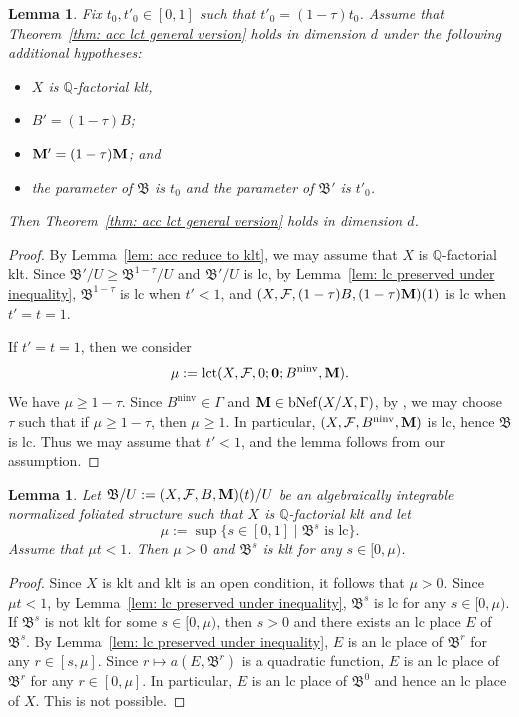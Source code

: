 \documentclass[11pt,reqno]{amsart}
\numberwithin{equation}{section}
\newcommand{\Mm}{{\bf{M}}}
\newcommand{\ninv}{\operatorname{ninv}}
\newcommand{\lct}{\operatorname{lct}}
\newcommand{\Bb}{{\mathfrak{B}}}
\newcommand{\Ff}{\mathcal{F}}
\newcommand{\Ii}{\Gamma}
\newcommand{\bNef}{\mathrm{bNef}}
\newtheorem{lem}[thm]{Lemma}
\theoremstyle{definition}
\begin{document}
\begin{lem}\label{lem: reduce to one parameter acc}
Fix $t_0, t'_0 \in [0, 1]$ such that $t'_0 = (1-\tau)t_0$.
    Assume that Theorem~\ref{thm: acc lct general version} holds in dimension $d$ under the following additional hypotheses:
    \begin{itemize}
        \item 
    $X$ is $\mathbb Q$-factorial klt, 
    \item $B'=(1-\tau)B$; \item $\Mm'=(1-\tau)\Mm$; and 
    \item the parameter of $\mathfrak B$ is $t_0$ and the parameter of $\mathfrak B'$ is $t'_0$. 
    \end{itemize}Then Theorem~\ref{thm: acc lct general version} holds in dimension $d$.
\end{lem}
\begin{proof}
By Lemma~\ref{lem: acc reduce to klt}, we may assume that $X$ is $\mathbb Q$-factorial klt. Since $\Bb'/U\geq\Bb^{1-\tau}/U$ and $\Bb'/U$ is lc, by Lemma~\ref{lem: lc preserved under inequality}, $\Bb^{1-\tau}$ is lc when $t'<1$, and $(X,\Ff,(1-\tau)B,(1-\tau)\Mm)(1)$ is lc when $t'=t=1$.

If $t'=t=1$, then we consider
$$\mu:=\lct(X,\Ff,0;\bm{0};B^{\ninv},\Mm).$$
We have $\mu\geq 1-\tau$. Since $B^{\ninv}\in\Ii$ and $\Mm\in\bNef(X/X,\Ii)$, by \cite[Theorem~2.4.4]{CHLX23}, we may choose $\tau$ such that if $\mu\geq 1-\tau$, then $\mu\geq 1$. In particular, $(X,\Ff,B^{\ninv},\Mm)$ is lc, hence $\Bb$ is lc. Thus we may assume that $t'<1$, and the lemma follows from our assumption. 
\end{proof}

\begin{lem}\label{lem: klt bs}
Let $\Bb/U:=(X,\Ff,B,\Mm)(t)/U$ be an algebraically integrable normalized foliated structure such that $X$ is $\mathbb Q$-factorial klt and let 
$$\mu:=\sup\{s\in [0,1]\mid \Bb^s\text{ is lc}\}.$$
Assume that $\mu t<1$. Then $\mu>0$ and $\Bb^{s}$ is klt for any $s\in [0,\mu)$.
\end{lem}
\begin{proof}
Since $X$ is klt and klt is an open condition, it follows that $\mu>0$. Since $\mu t<1$, by Lemma~\ref{lem: lc preserved under inequality}, $\Bb^s$ is lc for any $s\in [0,\mu)$. If $\Bb^s$ is not klt 
for some $s\in [0,\mu)$, then $s>0$ and there exists an lc place $E$ of $\Bb^s$. By Lemma~\ref{lem: lc preserved under inequality}, $E$ is an lc place of $\Bb^r$ for any $r\in [s,\mu]$. Since $r\mapsto a(E,\Bb^r)$ is a quadratic function,
$E$ is an lc place of $\Bb^r$ for any $r\in [0,\mu]$. In particular, $E$ is an lc place of $\Bb^0$ and hence an lc place of $X$. This is not possible.
\end{proof}
\end{document}
